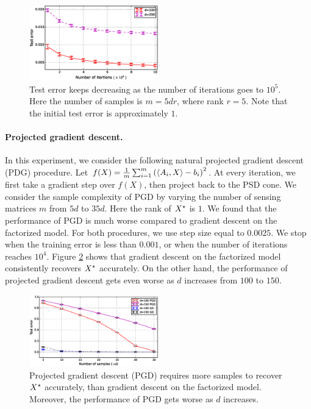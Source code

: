 \begin{figure}[!ht]
	\centering
	\includegraphics[width=0.5\textwidth]{accuracy.eps}
	\caption{Test error keeps decreasing as the number of iterations goes to $10^5$. Here the number of samples is $m = 5dr$, where rank $r = 5$. Note that the initial test error is approximately $1$.}
	\label{fig_accuracy}
\end{figure}

\paragraph{Projected gradient descent.}
In this experiment, we consider the following natural projected gradient descent (PDG) procedure.
Let $f(X) = \frac 1 m \sum_{i=1}^m \left(\langle A_i, X\rangle - b_i \right)^2$.
At every iteration, we first take a gradient step over $f(X)$,
then project back to the PSD cone.
We consider the sample complexity of PGD by varying the number of sensing
matrices $m$ from $5d$ to $35d$.
Here the rank of ${X}^\star$ is $1$.
We found that the performance of PGD is much worse compared to gradient descent on the factorized model.
For both procedures, we use step size equal to $0.0025$.
We stop when the training error is less than $0.001$, or when the number of iterations reaches $10^4$.
Figure \ref{fig_pgd} shows that gradient descent on the factorized model
consistently recovers ${X}^\star$ accurately.
On the other hand, the performance of projected gradient descent gets even worse as $d$ increases from $100$ to $150$.

\begin{figure}[!ht]
	\centering
	\includegraphics[width=0.5\textwidth]{compare_PGD.eps}
	\caption{Projected gradient descent (PGD) requires more samples to recover ${X}^\star$ accurately,
	than gradient descent on the factorized model.
	Moreover, the performance of PGD gets worse as $d$ increases.}
	\label{fig_pgd}
\end{figure}

